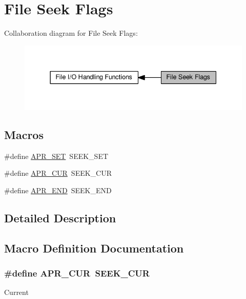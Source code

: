 \hypertarget{group__apr__file__seek__flags}{}\section{File Seek Flags}
\label{group__apr__file__seek__flags}
Collaboration diagram for File Seek Flags\+:
\nopagebreak
\begin{figure}[H]
\begin{center}
\leavevmode
\includegraphics[width=337pt]{group__apr__file__seek__flags}
\end{center}
\end{figure}
\subsection*{Macros}
\begin{DoxyCompactItemize}
\item 
\#define \hyperlink{group__apr__file__seek__flags_ga2fdf78845c897f69451d49e1e2b90ac9}{A\+P\+R\+\_\+\+S\+ET}~S\+E\+E\+K\+\_\+\+S\+ET
\item 
\#define \hyperlink{group__apr__file__seek__flags_gae17abc53fea00bfd51e184017113e250}{A\+P\+R\+\_\+\+C\+UR}~S\+E\+E\+K\+\_\+\+C\+UR
\item 
\#define \hyperlink{group__apr__file__seek__flags_ga438f3568be799d1e4bbd19492ca47d22}{A\+P\+R\+\_\+\+E\+ND}~S\+E\+E\+K\+\_\+\+E\+ND
\end{DoxyCompactItemize}


\subsection{Detailed Description}


\subsection{Macro Definition Documentation}
\subsubsection[{\texorpdfstring{A\+P\+R\+\_\+\+C\+UR}{APR_CUR}}]{\setlength{\rightskip}{0pt plus 5cm}\#define A\+P\+R\+\_\+\+C\+UR~S\+E\+E\+K\+\_\+\+C\+UR}\hypertarget{group__apr__file__seek__flags_gae17abc53fea00bfd51e184017113e250}{}\label{group__apr__file__seek__flags_gae17abc53fea00bfd51e184017113e250}
Current 
